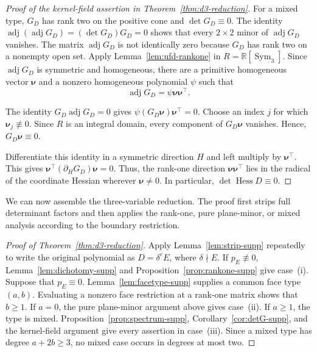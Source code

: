 \documentclass[12pt,a4paper]{article}
\theoremstyle{plain}
\theoremstyle{definition}
\newcommand{\R}{\mathbb{R}}
\newcommand{\Sym}{\operatorname{Sym}}
\newcommand{\adjm}{\operatorname{adj}}
\newcommand{\Hess}{\operatorname{Hess}}
\newcommand{\knu}{\boldsymbol{\nu}}
\begin{document}
\begin{proof}[Proof of the kernel-field assertion in Theorem~\ref{thm:d3-reduction}]
    For a mixed type, $G_D$ has rank two on the positive cone and $\det G_D\equiv0$.
    The identity $\adjm(\adjm G_D)=(\det G_D)G_D=0$ shows that every $2\times2$ minor of $\adjm G_D$ vanishes.
    The matrix $\adjm G_D$ is not identically zero because $G_D$ has rank two on a nonempty open set.
    Apply Lemma~\ref{lem:ufd-rankone} in $R=\R[\Sym_3]$.
    Since $\adjm G_D$ is symmetric and homogeneous, there are a primitive homogeneous vector $\knu$ and a nonzero homogeneous polynomial $\psi$ such that
    \begin{equation*}
        \adjm G_D
        =
        \psi\knu\knu^\top
        .
    \end{equation*}

    The identity $G_D\adjm G_D=0$ gives $\psi(G_D\knu)\knu^\top=0$.
    Choose an index $j$ for which $\knu_j\not\equiv0$.
    Since $R$ is an integral domain, every component of $G_D\knu$ vanishes.
    Hence, $G_D\knu\equiv0$.

    Differentiate this identity in a symmetric direction $H$ and left multiply by $\knu^\top$.
    This gives $\knu^\top(\partial_HG_D)\knu=0$.
    Thus, the rank-one direction $\knu\knu^\top$ lies in the radical of the coordinate Hessian wherever $\knu\ne0$.
    In particular, $\det\Hess D\equiv0$.
\end{proof}

We can now assemble the three-variable reduction.
The proof first strips full determinant factors and then applies the rank-one, pure plane-minor, or mixed analysis according to the boundary restriction.

\begin{proof}[Proof of Theorem~\ref{thm:d3-reduction}]
    Apply Lemma~\ref{lem:strip-supp} repeatedly to write the original polynomial as $D=\delta^eE$, where $\delta\nmid E$.
    If $p_E\not\equiv0$, Lemma~\ref{lem:dichotomy-supp} and Proposition~\ref{prop:rankone-supp} give case~(i).
    Suppose that $p_E\equiv0$.
    Lemma~\ref{lem:facetype-supp} supplies a common face type $(a,b)$.
    Evaluating a nonzero face restriction at a rank-one matrix shows that $b\ge1$.
    If $a=0$, the pure plane-minor argument above gives case~(ii).
    If $a\ge1$, the type is mixed.
    Proposition~\ref{prop:spectrum-supp}, Corollary~\ref{cor:detG-supp}, and the kernel-field argument give every assertion in case~(iii).
    Since a mixed type has degree $a+2b\ge3$, no mixed case occurs in degrees at most two.
\end{proof}
\end{document}
